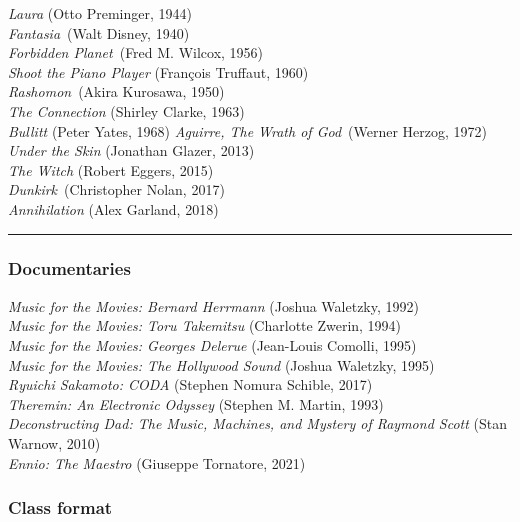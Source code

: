 \documentclass[]{tufte-handout}
\begin{document}
\emph{Laura} (Otto Preminger, 1944)\\
\emph{Fantasia}~(Walt Disney, 1940)\\
\emph{Forbidden Planet}~(Fred M. Wilcox, 1956)\\
\emph{Shoot the Piano Player} (François Truffaut, 1960)\\
\emph{Rashomon}~(Akira Kurosawa, 1950)\\
\emph{The Connection} (Shirley Clarke, 1963)\\
\emph{Bullitt} (Peter Yates, 1968) \emph{Aguirre, The Wrath of
God}~(Werner Herzog, 1972)\\
\emph{Under the Skin} (Jonathan Glazer, 2013)\\
\emph{The Witch} (Robert Eggers, 2015)\\
\emph{Dunkirk}~(Christopher Nolan, 2017)\\
\emph{Annihilation} (Alex Garland, 2018)

\begin{center}\rule{0.5\linewidth}{0.5pt}\end{center}

\hypertarget{documentaries}{%
\subsubsection{Documentaries}\label{documentaries}}

\emph{Music for the Movies: Bernard Herrmann} (Joshua Waletzky, 1992)\\
\emph{Music for the Movies: Toru Takemitsu} (Charlotte Zwerin, 1994)\\
\emph{Music for the Movies: Georges Delerue} (Jean-Louis Comolli,
1995)\\
\emph{Music for the Movies: The Hollywood Sound} (Joshua Waletzky,
1995)\\
\emph{Ryuichi Sakamoto: CODA} (Stephen Nomura Schible, 2017)\\
\emph{Theremin: An Electronic Odyssey} (Stephen M. Martin, 1993)\\
\emph{Deconstructing Dad: The Music, Machines, and Mystery of Raymond
Scott} (Stan Warnow, 2010)\\
\emph{Ennio: The Maestro} (Giuseppe Tornatore, 2021)

\hypertarget{class-format}{%
\subsubsection{Class format}\label{class-format}}
\end{document}
